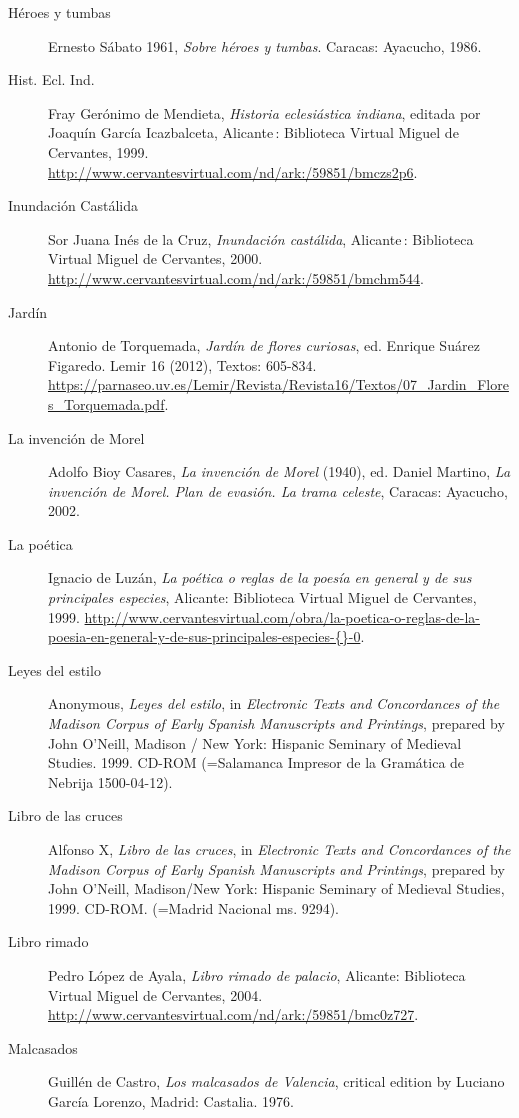 \begin{flushleft}
\begin{description}
\item[Héroes y tumbas]Ernesto Sábato 1961, \textit{Sobre héroes y tumbas}. Caracas: Ayacucho, 1986.
\item[Hist. Ecl. Ind.]Fray Gerónimo de Mendieta, \textit{Historia eclesiástica indiana}, editada por Joaquín García Icazbalceta, Alicante : Biblioteca Virtual Miguel de Cervantes, 1999. \url{http://www.cervantesvirtual.com/nd/ark:/59851/bmczs2p6}.
\item[Inundación Castálida]Sor Juana Inés de la Cruz, \textit{Inundación castálida}, Alicante : Biblioteca Virtual Miguel de Cervantes, 2000. \url{http://www.cervantesvirtual.com/nd/ark:/59851/bmchm544}.
\item[Jardín]Antonio de Torquemada, \textit{Jardín de flores curiosas}, ed. Enrique Suárez Figaredo. Lemir 16 (2012), Textos: 605-834. \url{https://parnaseo.uv.es/Lemir/Revista/Revista16/Textos/07\_Jardin\_Flores\_Torquemada.pdf}.
\item[La invención de Morel]Adolfo Bioy Casares, \textit{La invención de Morel} (1940), ed. Daniel Martino, \textit{La invención de Morel. Plan de evasión. La trama celeste}, Caracas: Ayacucho, 2002.
\item[La poética]Ignacio de Luzán, \textit{La poética o reglas de la poesía en general y de sus principales especies}, Alicante: Biblioteca Virtual Miguel de Cervantes, 1999. \url{http://www.cervantesvirtual.com/obra/la-poetica-o-reglas-de-la-poesia-en-general-y-de-sus-principales-especies-{}-0}.
\item[Leyes del estilo]Anonymous, \textit{Leyes del estilo}, in \textit{Electronic Texts and Concordances of the Madison Corpus of Early Spanish Manuscripts and Printings}, prepared by John O’Neill, Madison / New York: Hispanic Seminary of Medieval Studies. 1999. CD-ROM (=Salamanca Impresor de la Gramática de Nebrija 1500-04-12).
\item[Libro de las cruces]Alfonso X, \textit{Libro de las cruces}, in \textit{Electronic Texts and Concordances of the Madison Corpus of Early Spanish Manuscripts and Printings}, prepared by John O’Neill, Madison/New York: Hispanic Seminary of Medieval Studies, 1999. CD-ROM. (=Madrid Nacional ms. 9294).
\item[Libro rimado]Pedro López de Ayala, \textit{Libro rimado de palacio}, Alicante: Biblioteca Virtual Miguel de Cervantes, 2004. \url{http://www.cervantesvirtual.com/nd/ark:/59851/bmc0z727}.
\item[Malcasados]Guillén de Castro, \textit{Los malcasados de Valencia}, critical edition by Luciano García Lorenzo, Madrid: Castalia. 1976.

\end{description}
\end{flushleft}

